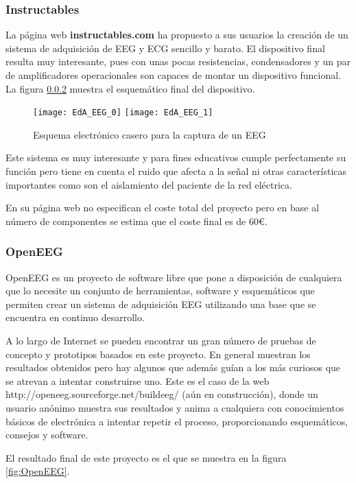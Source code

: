 \subsubsection{Instructables}

La página web \textbf{instructables.com} ha propuesto a sus usuarios la creación de un sistema de adquisición de EEG y ECG sencillo y barato. El dispositivo final resulta muy interesante, pues con unas pocas resistencias, condensadores y un par de amplificadores operacionales son capaces de montar un dispositivo funcional. La figura \ref{} muestra el esquemático final del dispositivo.

\begin{figure} [h]
    \centering
    \texttt{[image: EdA\_EEG\_0]}
    \texttt{[image: EdA\_EEG\_1]}
    \caption{Esquema electrónico casero para la captura de un EEG \cite{DIY_EEG}}
    \label{fig:EdA_EEG_1}
\end{figure}

Este sistema es muy interesante y para fines educativos cumple perfectamente su función pero tiene en cuenta el ruido que afecta a la señal ni otras características importantes como son el aislamiento del paciente de la red eléctrica.

En su página web no especifican el coste total del proyecto pero en base al número de componentes se estima que el coste final es de 60€.

\subsubsection{OpenEEG}

OpenEEG es un proyecto de software libre que pone a disposición de cualquiera que lo necesite un conjunto de herramientas, software y esquemáticos que permiten crear un sistema de adquisición EEG utilizando una base que se encuentra en continuo desarrollo.

A lo largo de Internet se pueden encontrar un gran número de pruebas de concepto y prototipos basados en este proyecto. En general muestran los resultados obtenidos pero hay algunos que además guían a los más curiosos que se atrevan a intentar construirse uno. Este es el caso de la web http://openeeg.sourceforge.net/buildeeg/ (aún en construcción), donde un usuario anónimo muestra sus resultados y anima a cualquiera con conocimientos básicos de electrónica a intentar repetir el proceso, proporcionando esquemáticos, consejos y software.

El resultado final de este proyecto es el que se muestra en la figura \ref{fig:OpenEEG}.

